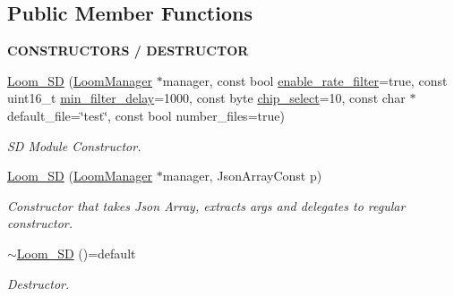 \subsection*{Public Member Functions}
\begin{Indent}{\bf C\+O\+N\+S\+T\+R\+U\+C\+T\+O\+RS / D\+E\+S\+T\+R\+U\+C\+T\+OR}\par
\begin{DoxyCompactItemize}
\item 
\hyperlink{class_loom___s_d_ab093eb043634c52abdacf9397b4577d6}{Loom\+\_\+\+SD} (\hyperlink{class_loom_manager}{Loom\+Manager} $\ast$manager, const bool \hyperlink{class_loom_log_plat_a6d343b76b79a1e51572bcf2991966e61}{enable\+\_\+rate\+\_\+filter}=true, const uint16\+\_\+t \hyperlink{class_loom_log_plat_a3d4ffe4204560b9677b8007be7f522be}{min\+\_\+filter\+\_\+delay}=1000, const byte \hyperlink{class_loom___s_d_a404b47d978c23b9426dcfe1fe3a185e1}{chip\+\_\+select}=10, const char $\ast$default\+\_\+file=\char`\"{}test\char`\"{}, const bool number\+\_\+files=true)
\begin{DoxyCompactList}\small\item\em SD Module Constructor. \end{DoxyCompactList}\item 
\hyperlink{class_loom___s_d_a383cfc7b80778db3cec41992c7aaa9af}{Loom\+\_\+\+SD} (\hyperlink{class_loom_manager}{Loom\+Manager} $\ast$manager, Json\+Array\+Const p)
\begin{DoxyCompactList}\small\item\em Constructor that takes Json Array, extracts args and delegates to regular constructor. \end{DoxyCompactList}\item 
\hyperlink{class_loom___s_d_af939aa14399dd1f04dae897fbafb3159}{$\sim$\+Loom\+\_\+\+SD} ()=default
\begin{DoxyCompactList}\small\item\em Destructor. \end{DoxyCompactList}\end{DoxyCompactItemize}
\end{Indent}
